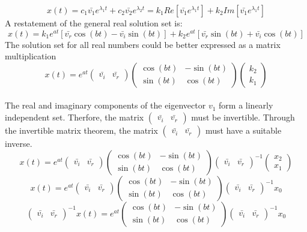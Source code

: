 $$x(t) = c_1\bar{v_1}e^{\lambda_1 t} + c_2\bar{v_2}e^{\lambda_2 t} = k_1Re[\bar{v_1}e^{\lambda_1 t}] + k_2Im[\bar{v_1}e^{\lambda_1 t}]$$
A restatement of the general real solution set is:
$$x(t)=k_1e^{at}[\bar{v_r}\cos{(bt)} - \bar{v_i}\sin{(bt)}] + k_2e^{at}[\bar{v_r}\sin{(bt)} + \bar{v_i}\cos{(bt)}]$$
The solution set for all real numbers could be better expressed as a matrix multiplication
$$x(t) = e^{at}\begin{pmatrix}\bar{v_i} & \bar{v_r} \end{pmatrix} \begin{pmatrix} \cos{(bt)}& -\sin{(bt)} \\ \sin{(bt)}& \cos{(bt)} \end{pmatrix} \begin{pmatrix} k_2 \\ k_1\end{pmatrix}$$
\\The real and imaginary components of the eigenvector $v_1$ form a linearly independent set. Therfore, the matrix $\displaystyle{\begin{pmatrix}\bar{v_i} & \bar{v_r} \end{pmatrix}}$ must be invertible. Through the invertible matrix theorem, the matrix $\displaystyle{\begin{pmatrix}\bar{v_i} & \bar{v_r} \end{pmatrix}}$ must have a suitable inverse. 
 $$x(t) = e^{at}\begin{pmatrix}\bar{v_i} & \bar{v_r} \end{pmatrix} \begin{pmatrix} \cos{(bt)}& -\sin{(bt)} \\  \sin{(bt)}& \cos{(bt)} \end{pmatrix} \begin{pmatrix}\bar{v_i} & \bar{v_r} \end{pmatrix}^{-1}  \begin{pmatrix}  x_2 \\ x_1\end{pmatrix}$$
 $$x(t) = e^{at}\begin{pmatrix}\bar{v_i} & \bar{v_r} \end{pmatrix} \begin{pmatrix} \cos{(bt)}& -\sin{(bt)} \\  \sin{(bt)}& \cos{(bt)} \end{pmatrix} \begin{pmatrix}\bar{v_i} & \bar{v_r} \end{pmatrix}^{-1}  x_0$$
$$\begin{pmatrix}\bar{v_i} & \bar{v_r} \end{pmatrix}^{-1}x(t) = e^{at} \begin{pmatrix} \cos{(bt)}& -\sin{(bt)} \\ \sin{(bt)}& \cos{(bt)} \end{pmatrix} \begin{pmatrix}\bar{v_i} & \bar{v_r} \end{pmatrix}^{-1}  x_0$$
